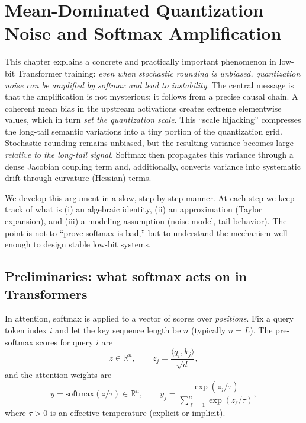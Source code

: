 \chapter{Mean-Dominated Quantization Noise and Softmax Amplification}
\label{ch:softmax_amplification_full}

This chapter explains a concrete and practically important phenomenon in low-bit
Transformer training: \emph{even when stochastic rounding is unbiased, quantization
noise can be amplified by softmax and lead to instability}. The central message is
that the amplification is not mysterious; it follows from a precise causal chain.
A coherent mean bias in the upstream activations creates extreme elementwise values,
which in turn \emph{set the quantization scale}. This ``scale hijacking'' compresses
the long-tail semantic variations into a tiny portion of the quantization grid.
Stochastic rounding remains unbiased, but the resulting variance becomes large
\emph{relative to the long-tail signal}. Softmax then propagates this variance through
a dense Jacobian coupling term and, additionally, converts variance into systematic
drift through curvature (Hessian) terms.

We develop this argument in a slow, step-by-step manner. At each step we keep track
of what is (i) an algebraic identity, (ii) an approximation (Taylor expansion), and
(iii) a modeling assumption (noise model, tail behavior). The point is not to
``prove softmax is bad,'' but to understand the mechanism well enough to design
stable low-bit systems.

\section{Preliminaries: what softmax acts on in Transformers}

In attention, softmax is applied to a vector of scores over \emph{positions}.
Fix a query token index $i$ and let the key sequence length be $n$ (typically $n=L$).
The pre-softmax scores for query $i$ are
\begin{equation}
z \in \mathbb{R}^{n},\qquad
z_j = \frac{\langle q_i, k_j\rangle}{\sqrt{d}},
\end{equation}
and the attention weights are
\begin{equation}
y = \mathrm{softmax}(z/\tau)\in\mathbb{R}^n,\qquad
y_j = \frac{\exp(z_j/\tau)}{\sum_{\ell=1}^{n}\exp(z_\ell/\tau)},
\end{equation}
where $\tau>0$ is an effective temperature (explicit or implicit).

